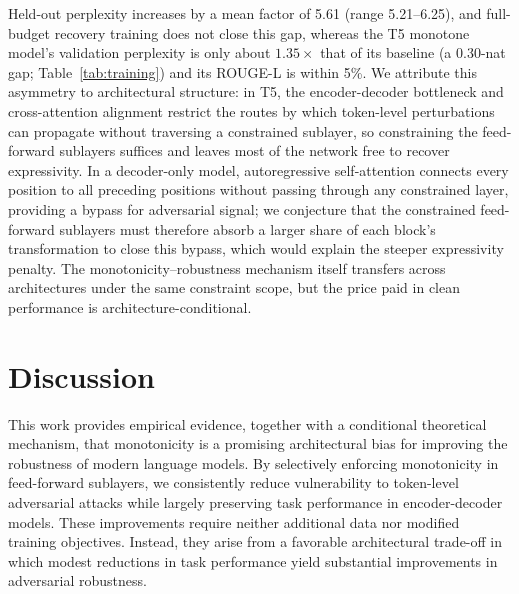 \documentclass{article}
\theoremstyle{plain}
\theoremstyle{definition}
\theoremstyle{remark}
\begin{document}
Held-out perplexity increases by a mean factor of 5.61 (range 5.21--6.25), and full-budget recovery training does not close this gap, whereas the T5 monotone model's validation perplexity is only about $1.35\times$ that of its baseline (a 0.30-nat gap; Table~\ref{tab:training}) and its ROUGE-L is within 5\%. We attribute this asymmetry to architectural structure: in T5, the encoder-decoder bottleneck and cross-attention alignment restrict the routes by which token-level perturbations can propagate without traversing a constrained sublayer, so constraining the feed-forward sublayers suffices and leaves most of the network free to recover expressivity.
In a decoder-only model, autoregressive self-attention connects every position to all preceding positions without passing through any constrained layer, providing a bypass for adversarial signal; we conjecture that the constrained feed-forward sublayers must therefore absorb a larger share of each block's transformation to close this bypass, which would explain the steeper expressivity penalty. The monotonicity--robustness mechanism itself transfers across architectures under the same constraint scope, but the price paid in clean performance is architecture-conditional. %

\section{Discussion}

This work provides empirical evidence, together with a conditional theoretical mechanism, that monotonicity is a promising architectural bias
for improving the robustness of modern language models. By selectively enforcing monotonicity in feed-forward sublayers, we consistently reduce vulnerability to token-level adversarial attacks while largely preserving task performance in encoder-decoder models.
These improvements require neither additional data nor
modified training objectives. Instead, they arise from a
favorable architectural trade-off in which modest reductions in
task performance yield substantial improvements in adversarial
robustness.
\end{document}
